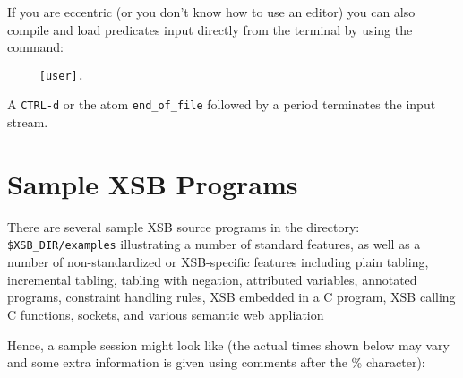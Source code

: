 If you are eccentric (or you don't know how to use an editor) you can also 
compile and load predicates input directly from the terminal by using the
command:
\begin{verbatim}
     [user].
\end{verbatim}
A {\tt CTRL-d} or the atom \verb'end_of_file' followed by a period 
terminates the input stream.


\section{Sample XSB Programs}

There are several sample XSB source programs in the directory: {\tt
  \$XSB\_DIR/examples} illustrating a number of standard features, as
well as a number of non-standardized or XSB-specific features
including plain tabling, incremental tabling, tabling with negation,
attributed variables, annotated programs, constraint handling rules,
XSB embedded in a C program, XSB calling C functions, sockets, and
various semantic web appliation

Hence, a sample session might look like
(the actual times shown below may vary and some extra information is given
using comments after the \% character):

